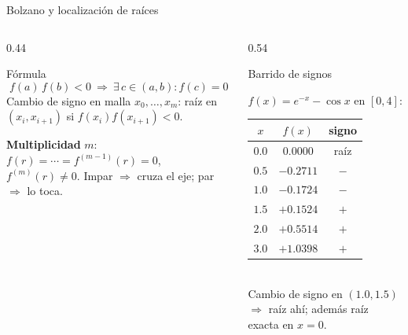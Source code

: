 \documentclass[aspectratio=169,10pt]{beamer}
\begin{document}
\begin{frame}{Bolzano y localización de raíces}
\begin{columns}[T]
\begin{column}{0.44\textwidth}
\begin{cardidea}{Fórmula}{\faSuperscript}
$$f(a)\,f(b)<0\ \Rightarrow\ \exists\,c\in(a,b):f(c)=0$$
{\footnotesize Cambio de signo en malla $x_0,\dots,x_m$: raíz en $(x_i,x_{i+1})$ si $f(x_i)f(x_{i+1})<0$.}
\end{cardidea}
\vspace{1mm}
\begin{cardnota}[\faInfoCircle]
{\footnotesize \textbf{Multiplicidad} $m$: $f(r){=}\cdots{=}f^{(m-1)}(r){=}0$, $f^{(m)}(r)\neq0$. Impar $\Rightarrow$ cruza el eje; par $\Rightarrow$ lo toca.}
\end{cardnota}
\end{column}
\begin{column}{0.54\textwidth}
\begin{cardgear}{Barrido de signos}{\faTable}
\centering
{\footnotesize $f(x)=e^{-x}-\cos x$ en $[0,4]$:\\[1mm]
\renewcommand{\arraystretch}{1.15}\setlength{\tabcolsep}{5pt}
\begin{tabular}{c|cc}
$x$ & $f(x)$ & signo\\\hline
$0.0$&$0.0000$&raíz\\ $0.5$&$-0.2711$&$-$\\ $1.0$&$-0.1724$&$-$\\ $1.5$&$+0.1524$&$+$\\ $2.0$&$+0.5514$&$+$\\ $3.0$&$+1.0398$&$+$\\
\end{tabular}}\\[1mm]
{\footnotesize Cambio de signo en $(1.0,1.5)$ $\Rightarrow$ raíz ahí; además raíz exacta en $x{=}0$.}
\end{cardgear}
\end{column}
\end{columns}
\end{frame}
\end{document}
